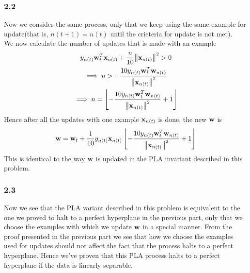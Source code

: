 \documentclass[11pt]{article}
\theoremstyle{definition}
\begin{document}
\subsubsection*{2.2}
Now we consider the same process, only that we keep using the same example for update(that is, $n(t+1) = n(t)$ until the crieteria for update is not met). \\ 
We now calculate the number of updates that is made with an example 
\begin{gather*}
  y_{n(t)}\vb{w}_t^T\vb{x}_{n(t)} + \frac{n}{10}\norm{\vb{x}_{n(t)}}^2 > 0 \\ 
  \implies n > -\frac{10y_{n(t)}\vb{w}_t^T\vb{w}_{n(t)}}{\norm{\vb{x}_{n(t)}}^2} \\ 
  \implies n = \left\lfloor-\frac{10y_{n(t)}\vb{w}_t^T\vb{w}_{n(t)}}{\norm{\vb{x}_{n(t)}}^2} + 1\right\rfloor
\end{gather*}
Hence after all the updates with one example $\vb{x}_{n(t)}$ is done, the new $\vb{w}$ is 
\[
  \vb{w} = \vb{w}_t + \frac{1}{10}y_{n(t)}\vb{x}_{n(t)}\left\lfloor-\frac{10y_{n(t)}\vb{w}_t^T\vb{w}_{n(t)}}{\norm{\vb{x}_{n(t)}}^2} + 1\right\rfloor
\]
This is identical to the way $\vb{w}$ is updated in the PLA invariant described in this problem.
\subsubsection*{2.3}
Now we see that the PLA variant described in this problem is equivalent to the one we proved to halt to a perfect hyperplane in the previous part, only that we choose the examples with which we update $\vb{w}$ in a special manner. From the proof presented in the previous part we see that how we choose the examples used for updates should not affect the fact that the process halts to a perfect hyperplane. Hence we've proven that this PLA process halts to a perfect hyperplane if the data is linearly separable.
\end{document}
